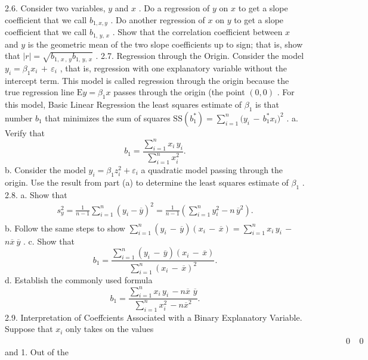 \documentclass[11pt]{article}
\begin{document}
2.6. Consider two variables, \(y\) and \(x\) . Do a regression of \(y\) on \(x\) to get a slope
coefficient that we call \(b_{1 , x , y}\) . Do another regression of \(x\) on \(y\) to get a
slope coefficient that we call \(b_{1 , \, y , \, x}\) . Show that the correlation coefficient
between \(x\) and \(y\) is the geometric mean of the two slope coefficients up to
sign; that is, show that \(\left\vert r \right\vert=\sqrt{b_{1 , \, x \, , \, y} b_{1 , \, y , \, x}}\) .
2.7. Regression through the Origin. Consider the model \(y_{i}=\beta_{1} x_{i} \,+\, \varepsilon_{i}\) , that
 is, regression with one explanatory variable without the intercept term. This
model is called regression through the origin because the true regression
line \(\textrm{E} y=\beta_{1} x\) passes through the origin (the point \(( 0 , 0 )\) . For this model,
 Basic Linear Regression
the least squares estimate of \(\beta_{1}\) is that number \(b_{1}\) that minimizes the sum
 of squares \(\mathrm{S S} ( b_{1}^{*} )=\sum_{i=1}^{n} \big( y_{i} \,-\, b_{1}^{*} x_{i} \big)^{2}\) .
a. Verify that
\[
b_{1}=\frac{\sum_{i=1}^{n} x_{i} \, y_{i}} {\sum_{i=1}^{n} x_{i}^{2}} .
\]
b. Consider the model \(y_{i}=\beta_{1} z_{i}^{2}+\varepsilon_{i}\) a quadratic model passing through
the origin. Use the result from part (a) to determine the least squares
estimate of \(\beta_{1}\) .
2.8. a. Show that
\[
\begin{aligned} {s_{y}^{2}=\frac{1} {n-1} \sum_{i=1}^{n} \left( y_{i}-\overline{{y}} \right)^{2}=\frac{1} {n-1} \left( \sum_{i=1}^{n} y_{i}^{2}-n \, \overline{{y}}^{2} \right) .} \\ \end{aligned}
\]
b. Follow the same steps to show \(\sum_{i \mathop{=} 1}^{n} \left( y_{i} \,-\, \overline{{y}} \right) ( x_{i} \,-\, \overline{{x}} )=\sum_{i \mathop{=} 1}^{n} x_{i} \, y_{i} \,-\)
\(n \overline{{x}} ~ \overline{{y}}\) .
c. Show that
\[
b_{1}=\frac{{\sum_{i=1}^{n} \left( y_{i} \,-\, \overline{{y}} \right) \left( x_{i} \,-\, \overline{{x}} \right)}} {{\sum_{i=1}^{n} \left( x_{i} \,-\, \overline{{x}} \right)^{2}}} .
\]
 d. Establish the commonly used formula
\[
b_{1}=\frac{\sum_{i=1}^{n} x_{i} \, y_{i} \,-n \overline{{x}} \, \, \overline{{y}}} {\sum_{i=1}^{n} x_{i}^{2} \,-n \overline{{x}}^{2}} .
\]
2.9. Interpretation of Coeffcients Associated with a Binary Explanatory
Variable. Suppose that \(x_{i}\) only takes on the values \(\; \; \; \; \; \; \; \; \; \; \; \; \; \; \; \; \; \; \; \; \; \; \; \; \; \; \; \; \; \; \; \; \; \; \; \; \; \; \; \; \; \; \; \; \; \; \; \; \; \; \; \; \; \; \; \; \; \; \; \; \; \; \; \; \; \; \; \; \; \; \; \; \; \; \; \; \; \; \; \; \; \; \; \; \; \; \; \; \; \; \; \; \; \; \; \; \; \; \; \; \; \; \; \; \; \; \; \; \; \; \; \; \; \; \; \; \; \; \; \; \; \; \; \; \; \; \; \; \; \; \; \; \; \; \; \; \; \; \; \; \; \; \; \; \; \; \; 0 \; \; \; \; 0\) and 1. Out of the
\end{document}
